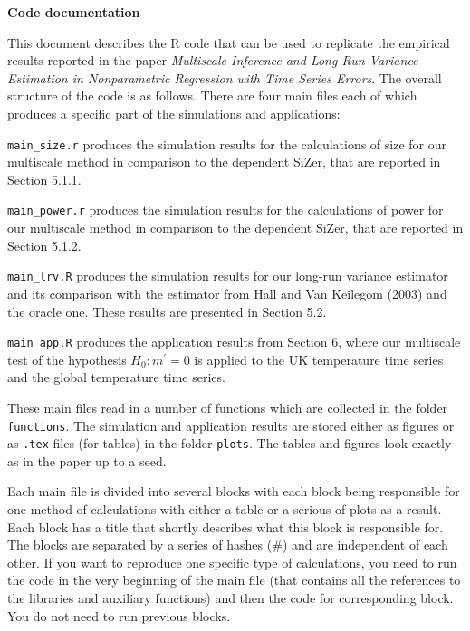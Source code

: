 \documentclass[a4paper,12pt]{article}
\begin{document}
\begin{center}
{\LARGE \bf Code documentation}
\end{center}
\vspace{0.5cm}


\setlength{\parskip}{0.2cm} 
This document describes the R code that can be used to replicate the empirical results reported in the paper \textit{Multiscale Inference and Long-Run Variance Estimation in Nonparametric Regression with Time Series Errors}. The overall structure of the code is as follows. There are four main files each of which produces a specific part of the simulations and applications:
\vspace{0.2cm}

\everypar{\hangafter=1\hangindent=1.45cm\relax}
\verb|main_size.r| \hspace{1pt} produces the simulation results for the calculations of size for our multiscale method in comparison to the dependent SiZer, that are reported in Section 5.1.1.

\verb|main_power.r| \hspace{1pt} produces the simulation results for the calculations of power for our multiscale method in comparison to the dependent SiZer, that are reported in Section 5.1.2.

\verb|main_lrv.R| \hspace{1pt} produces the simulation results for our long-run variance estimator and its comparison with the estimator from Hall and Van Keilegom (2003) and the oracle one. These results are presented in Section 5.2.

\verb|main_app.R| \hspace{1pt} produces the application results from Section 6, where our multiscale test of the hypothesis $H_0: m^\prime = 0$ is applied to the UK temperature time series and the global temperature time series.


\everypar{\hangafter=0\relax}
These main files read in a number of functions which are collected in the folder \verb|functions|. The simulation and application results are stored either as figures or as \verb|.tex| files (for tables) in the folder \verb|plots|. The tables and figures look exactly as in the paper up to a seed.
\vspace{0.2cm}

Each main file is divided into several blocks with each block being responsible for one method of calculations with either a table or a serious of plots as a result. Each block has a title that shortly describes what this block is responsible for. The blocks are separated by a series of hashes ($\#$) and are independent of each other. If you want to reproduce one specific type of calculations, you need to run the code in the very beginning of the main file (that contains all the references to the libraries and auxiliary functions) and then the code for corresponding block. You do not need to run previous blocks.
\vspace{0.2cm}
\end{document}
